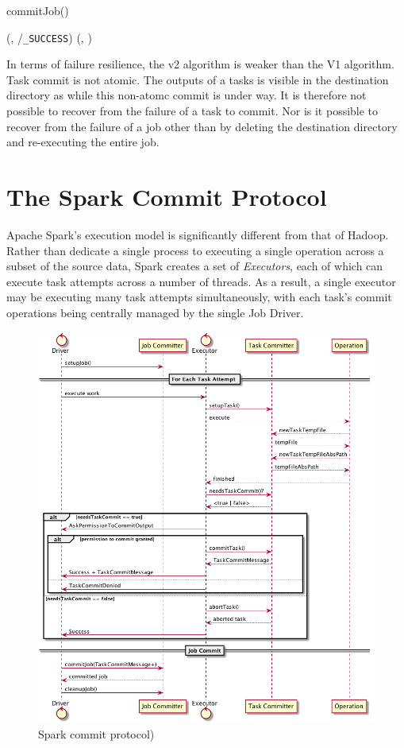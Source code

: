 \documentclass[conference]{IEEEtran}
\newcommand{\SUCCESS}{\texttt{\_SUCCESS}}
\begin{document}
\begin{procedure*}
  \caption{commitJob()}
  \touch(\fs, \dest/\SUCCESS)\;
  \delete(\fs, \temp)\;
\end{procedure*}

In terms of failure resilience, the v2 algorithm is weaker than the V1 algorithm.
Task commit is not atomic.
The outputs of a tasks is visible in the destination directory
as while this non-atomc commit is under way.
It is therefore not possible to recover from the failure of a task to commit.
Nor is it possible to recover from the failure of a job other than by deleting
the destination directory and re-executing the entire job.




\section{The Spark Commit Protocol}
\label{sec:theSparkCommitProtocol}

Apache Spark's execution model is significantly different from
that of Hadoop.
Rather than dedicate a single process to executing a single operation
across a subset of the source data, Spark creates a set of \emph{Executors},
each of which can execute task attempts across a number of threads.
As a result, a single executor may be executing many task attempts
simultaneously, with each task's commit operations being centrally managed
by the single Job Driver.

\begin{figure}
  \centering
  \includegraphics[width=.8\textwidth]{spark-protocol.png}
  \caption{Spark commit protocol)}
  \label{fig:spark-protocol}
\end{figure}
\end{document}
